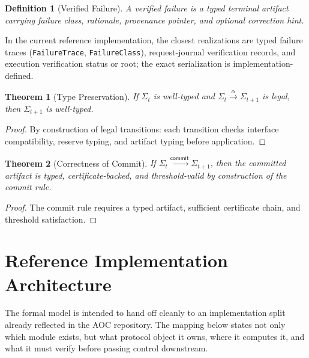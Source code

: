 \documentclass[11pt]{article}
\newtheorem{definition}{Definition}[section]
\newtheorem{theorem}{Theorem}[section]
\theoremstyle{remark}
\newcommand{\AOC}{\textup{\textsc{AOC}}}
\newcommand{\Commit}{\mathsf{commit}}
\begin{document}
\begin{definition}[Verified Failure]
A verified failure is a typed terminal artifact carrying failure class, rationale, provenance pointer, and optional correction hint.
\end{definition}
In the current reference implementation, the closest realizations are typed failure traces (\texttt{FailureTrace}, \texttt{FailureClass}), request-journal verification records, and execution verification status or root; the exact serialization is implementation-defined.

\begin{theorem}[Type Preservation]
If \(\Sigma_t\) is well-typed and \(\Sigma_t \xrightarrow{\alpha} \Sigma_{t+1}\) is legal, then \(\Sigma_{t+1}\) is well-typed.
\end{theorem}

\begin{proof}
By construction of legal transitions: each transition checks interface compatibility, reserve typing, and artifact typing before application.
\end{proof}

\begin{theorem}[Correctness of Commit]
If \(\Sigma_t \xrightarrow{\Commit} \Sigma_{t+1}\), then the committed artifact is typed, certificate-backed, and threshold-valid by construction of the commit rule.
\end{theorem}

\begin{proof}
The commit rule requires a typed artifact, sufficient certificate chain, and threshold satisfaction.
\end{proof}

\section[Reference Implementation]{Reference Implementation Architecture}

The formal model is intended to hand off cleanly to an implementation split already reflected in the \AOC{} repository. The mapping below states not only which module exists, but what protocol object it owns, where it computes it, and what it must verify before passing control downstream.
\end{document}
